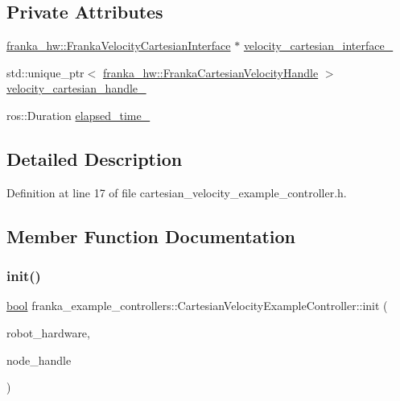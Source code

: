 \subsection*{Private Attributes}
\begin{DoxyCompactItemize}
\item 
\hyperlink{classfranka__hw_1_1FrankaVelocityCartesianInterface}{franka\+\_\+hw\+::\+Franka\+Velocity\+Cartesian\+Interface} $\ast$ \hyperlink{classfranka__example__controllers_1_1CartesianVelocityExampleController_a252b7cc51863ad43fe4fb01bd07c6947}{velocity\+\_\+cartesian\+\_\+interface\+\_\+}
\item 
std\+::unique\+\_\+ptr$<$ \hyperlink{classfranka__hw_1_1FrankaCartesianVelocityHandle}{franka\+\_\+hw\+::\+Franka\+Cartesian\+Velocity\+Handle} $>$ \hyperlink{classfranka__example__controllers_1_1CartesianVelocityExampleController_a70d748ed0786497d2ca847e011c237c9}{velocity\+\_\+cartesian\+\_\+handle\+\_\+}
\item 
ros\+::\+Duration \hyperlink{classfranka__example__controllers_1_1CartesianVelocityExampleController_aea64d1bd4901f1b2a3f953f53c9d973c}{elapsed\+\_\+time\+\_\+}
\end{DoxyCompactItemize}


\subsection{Detailed Description}


Definition at line 17 of file cartesian\+\_\+velocity\+\_\+example\+\_\+controller.\+h.



\subsection{Member Function Documentation}
\mbox{\label{classfranka__example__controllers_1_1CartesianVelocityExampleController_a74c17e2afdd736f29e0d165362ddc212}} 
\subsubsection{\texorpdfstring{init()}{init()}}
{\footnotesize\ttfamily \hyperlink{classbool}{bool} franka\+\_\+example\+\_\+controllers\+::\+Cartesian\+Velocity\+Example\+Controller\+::init (\begin{DoxyParamCaption}\item[{hardware\+\_\+interface\+::\+Robot\+HW $\ast$}]{robot\+\_\+hardware,  }\item[{ros\+::\+Node\+Handle \&}]{node\+\_\+handle }\end{DoxyParamCaption})\hspace{0.3cm}{\ttfamily [override]}}



